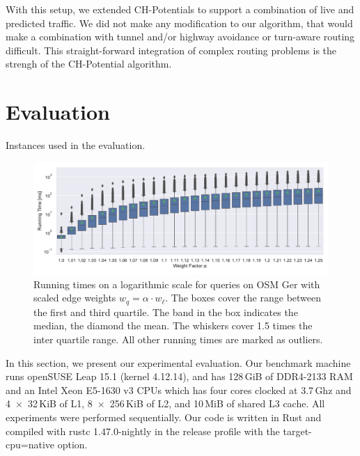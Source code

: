 \documentclass[letterpaper]{article} %
\begin{document}
With this setup, we extended CH-Potentials to support a combination of live and predicted traffic.
We did not make any modification to our algorithm, that would make a combination with tunnel and/or highway avoidance or turn-aware routing difficult.
This straight-forward integration of complex routing problems is the strengh of the CH-Potential algorithm.

\section{Evaluation}

\label{sec:experiments}

\begin{table}
\centering
\caption{Instances used in the evaluation.}\label{tab:graphs}

\end{table}

\begin{figure}
\centering
\includegraphics[width=\textwidth]{fig/scaled_weights.pdf}
\caption{
Running times on a logarithmic scale for queries on OSM Ger with scaled edge weights $w_q = \alpha \cdot w_\ell$.
The boxes cover the range between the first and third quartile.
The band in the box indicates the median, the diamond the mean.
The whiskers cover 1.5 times the inter quartile range.
All other running times are marked as outliers.
}\label{fig:scaled_weights}
\end{figure}

In this section, we present our experimental evaluation.
Our benchmark machine runs openSUSE Leap 15.1 (kernel 4.12.14), and has 128\,GiB of DDR4-2133 RAM and an Intel Xeon E5-1630 v3 CPUs which has four cores clocked at 3.7\,Ghz and 4~$\times$~32\,KiB of L1, 8~$\times$~256\,KiB of L2, and 10\,MiB of shared L3 cache.
All experiments were performed sequentially.
Our code is written in Rust and compiled with rustc 1.47.0-nightly in the release profile with the target-cpu=native option.
\end{document}
